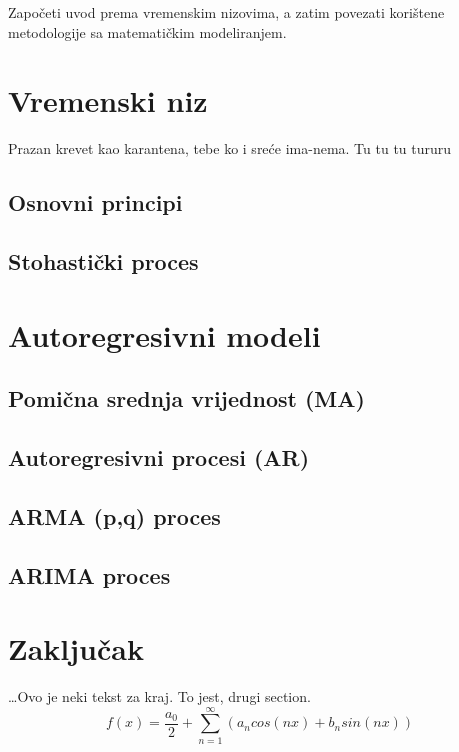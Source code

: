 \documentclass[a4paper,12pt,oneside]{memoir}
\newcommand{\fourierovred}{f(x)= \frac{a_0}{2}+\sum_{n=1}^\infty (a_n cos(nx)+b_n sin(nx))}
\begin{document}
            Započeti uvod prema vremenskim nizovima, a zatim povezati korištene metodologije sa matematičkim modeliranjem.
    \chapter{Vremenski niz}

        Prazan krevet kao karantena, tebe ko i sreće ima-nema. Tu tu tu tururu

        \section{Osnovni principi}
        \section{Stohastički proces}
    \chapter{Autoregresivni modeli}
        \section{Pomična srednja vrijednost (MA)}
        \section{Autoregresivni procesi (AR)}
        \section{ARMA (p,q) proces}
        \section{ARIMA proces}
    \chapter{Zaključak}
        \ldots{}Ovo je neki tekst za kraj. To jest, drugi section.
        $$\fourierovred$$
\end{document}
